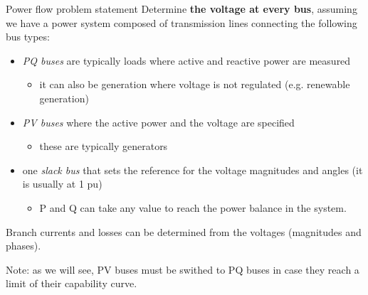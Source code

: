 \begin{frame}[allowframebreaks]{Power flow problem statement}
    Determine \textbf{the voltage at every bus}, assuming we have a power system composed of transmission lines connecting the following bus types:
    \begin{itemize}
        \item \textit{PQ buses} are typically loads where active and reactive power are measured
        \begin{itemize}
            \item it can also be generation where voltage is not regulated (e.g. renewable generation)
        \end{itemize}
        \item \textit{PV buses} where the active power and the voltage are specified
        \begin{itemize}
            \item these are typically generators
        \end{itemize}
        \item one \textit{slack bus} that sets the reference for the voltage magnitudes and angles (it is usually at 1 pu)
        \begin{itemize}
            \item P and Q can take any value to reach the power balance in the system.
        \end{itemize}
    \end{itemize}
    
    Branch currents and losses can be determined from the voltages (magnitudes and phases).
    
    Note: as we will see, PV buses must be swithed to PQ buses in case they reach a limit of their capability curve.
\end{frame}

